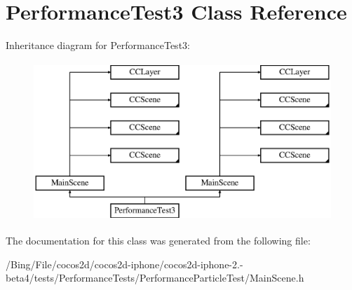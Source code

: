 \hypertarget{interface_performance_test3}{\section{Performance\-Test3 Class Reference}
\label{interface_performance_test3}
}
Inheritance diagram for Performance\-Test3\-:\begin{figure}[H]
\begin{center}
\leavevmode
\includegraphics[height=6.000000cm]{interface_performance_test3}
\end{center}
\end{figure}


The documentation for this class was generated from the following file\-:\begin{DoxyCompactItemize}
\item 
/\-Bing/\-File/cocos2d/cocos2d-\/iphone/cocos2d-\/iphone-\/2.-\/beta4/tests/\-Performance\-Tests/\-Performance\-Particle\-Test/Main\-Scene.\-h\end{DoxyCompactItemize}

